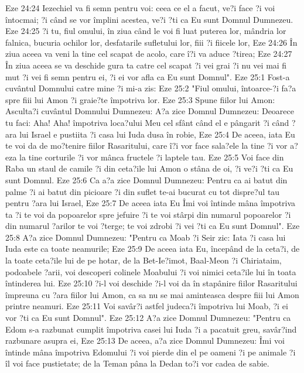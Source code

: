 Eze 24:24  Iezechiel va fi semn pentru voi: ceea ce el a facut, ve?i face ?i voi întocmai; ?i când se vor împlini acestea, ve?i ?ti ca Eu sunt Domnul Dumnezeu.
Eze 24:25  ?i tu, fiul omului, în ziua când le voi fi luat puterea lor, mândria lor falnica, bucuria ochilor lor, desfatarile sufletului lor, fiii ?i fiicele lor,
Eze 24:26  În ziua aceea va veni la tine cel scapat de acolo, care î?i va aduce ?tirea;
Eze 24:27  În ziua aceea se va deschide gura ta catre cel scapat ?i vei grai ?i nu vei mai fi mut ?i vei fi semn pentru ei, ?i ei vor afla ca Eu sunt Domnul".
Eze 25:1  Fost-a cuvântul Domnului catre mine ?i mi-a zis:
Eze 25:2  "Fiul omului, întoarce-?i fa?a spre fiii lui Amon ?i graie?te împotriva lor.
Eze 25:3  Spune fiilor lui Amon: Asculta?i cuvântul Domnului Dumnezeu: A?a zice Domnul Dumnezeu: Deoarece tu faci: Aha! Aha! împotriva loca?ului Meu cel sfânt când el e pângarit ?i când ?ara lui Israel e pustiita ?i casa lui Iuda dusa în robie,
Eze 25:4  De aceea, iata Eu te voi da de mo?tenire fiilor Rasaritului, care î?i vor face sala?ele la tine ?i vor a?eza la tine corturile ?i vor mânca fructele ?i laptele tau.
Eze 25:5  Voi face din Raba un staul de camile ?i din ceta?ile lui Amon o stâna de oi, ?i ve?i ?ti ca Eu sunt Domnul.
Eze 25:6  Ca a?a zice Domnul Dumnezeu: Pentru ca ai batut din palme ?i ai batut din picioare ?i din suflet te-ai bucurat cu tot dispre?ul tau pentru ?ara lui Israel,
Eze 25:7  De aceea iata Eu Îmi voi întinde mâna împotriva ta ?i te voi da popoarelor spre jefuire ?i te voi stârpi din numarul popoarelor ?i din numarul ?arilor te voi ?terge; te voi zdrobi ?i vei ?ti ca Eu sunt Domnul".
Eze 25:8  A?a zice Domnul Dumnezeu: "Pentru ca Moab ?i Seir zic: Iata ?i casa lui Iuda este ca toate neamurile;
Eze 25:9  De aceea iata Eu, începând de la ceta?i, de la toate ceta?ile lui de pe hotar, de la Bet-Ie?imot, Baal-Meon ?i Chiriataim, podoabele ?arii, voi descoperi colinele Moabului ?i voi nimici ceta?ile lui în toata întinderea lui.
Eze 25:10  ?i-l voi deschide ?i-l voi da în stapânire fiilor Rasaritului împreuna cu ?ara fiilor lui Amon, ca sa nu se mai aminteasca despre fiii lui Amon printre neamuri.
Eze 25:11  Voi savâr?i astfel judeca?i împotriva lui Moab, ?i ei vor ?ti ca Eu sunt Domnul".
Eze 25:12  A?a zice Domnul Dumnezeu: "Pentru ca Edom s-a razbunat cumplit împotriva casei lui Iuda ?i a pacatuit greu, savâr?ind razbunare asupra ei,
Eze 25:13  De aceea, a?a zice Domnul Dumnezeu: Îmi voi întinde mâna împotriva Edomului ?i voi pierde din el pe oameni ?i pe animale ?i îl voi face pustietate; de la Teman pâna la Dedan to?i vor cadea de sabie.
